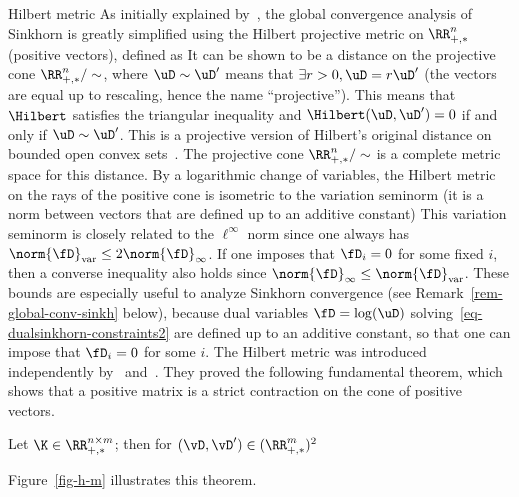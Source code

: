 \begin{rem1}{Hilbert metric}
As initially explained by~\citep{franklin1989scaling}, the global convergence analysis of Sinkhorn is greatly simplified using the Hilbert projective metric on $\RR_{+,*}^n$ (positive vectors), defined as
It can be shown to be a distance on the projective cone $\RR_{+,*}^n/\sim$, where $\uD \sim \uD'$ means that $\exists r>0, \uD=r\uD'$ (the vectors are equal up to rescaling, hence the name ``projective'').  
%
This means that $\Hilbert$ satisfies the triangular inequality and $\Hilbert(\uD,\uD')=0$ if and only if $\uD \sim \uD'$. 
%
This is a projective version of Hilbert's original distance on bounded open convex sets~\citep{hilbert1895gerade}.
%
The projective cone $\RR_{+,*}^n/\sim$ is a complete metric space for this distance. 
%
By a logarithmic change of variables, the Hilbert metric on the rays of the positive cone is isometric to the variation seminorm (it is a norm between vectors that are defined up to an additive constant)
%
This variation seminorm is closely related to the $\ell^\infty$ norm since one always has $\norm{\fD}_{\text{var}}  \leq 2 \norm{\fD}_\infty$. If one imposes that $\fD_i=0$ for some fixed $i$, then a converse inequality also holds since $\norm{\fD}_\infty \leq \norm{\fD}_{\text{var}}$. These bounds are especially useful to analyze Sinkhorn convergence (see Remark~\ref{rem-global-conv-sinkh} below), because dual variables $\fD=\log(\uD)$ solving~\eqref{eq-dualsinkhorn-constraints2} are defined up to an additive constant, so that one can impose that $\fD_i=0$ for some $i$.
%
The Hilbert metric was introduced independently by~\citep{birkhoff1957extensions} and~\citep{samelson1957perron}. They proved the following fundamental theorem, which shows that a positive matrix is a strict contraction on the cone of positive vectors.


\begin{thm}\label{thm-birkoff}
	Let $\K \in \RR_{+,*}^{n \times m}$; then for $(\vD,\vD') \in (\RR_{+,*}^m)^2$
\end{thm}

Figure~\ref{fig-h-m} illustrates this theorem. 
\end{rem1}


